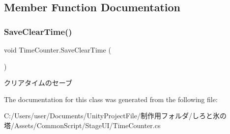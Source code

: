 \subsection{Member Function Documentation}
\mbox{\label{class_time_counter_a9db34ad1843ea7df7e1d518300b42e1d}} 
\subsubsection{\texorpdfstring{Save\+Clear\+Time()}{SaveClearTime()}}
{\footnotesize\ttfamily void Time\+Counter.\+Save\+Clear\+Time (\begin{DoxyParamCaption}{ }\end{DoxyParamCaption})\hspace{0.3cm}{\ttfamily [inline]}}



クリアタイムのセーブ 



The documentation for this class was generated from the following file\+:\begin{DoxyCompactItemize}
\item 
C\+:/\+Users/user/\+Documents/\+Unity\+Project\+File/制作用フォルダ/しろと氷の塔/\+Assets/\+Common\+Script/\+Stage\+U\+I/Time\+Counter.\+cs\end{DoxyCompactItemize}
